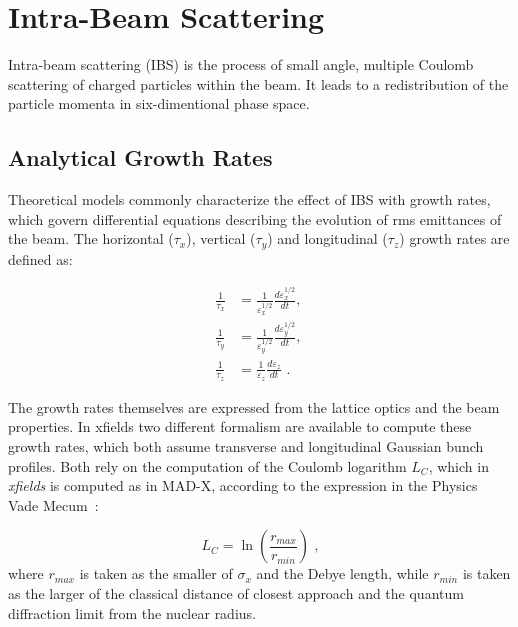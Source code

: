 \section{Intra-Beam Scattering}

Intra-beam scattering (IBS) is the process of small angle, multiple Coulomb scattering of charged particles within the beam.
It leads to a redistribution of the particle momenta in six-dimentional phase space.

\subsection{Analytical Growth Rates}

Theoretical models commonly characterize the effect of IBS with growth rates, which govern differential equations describing the evolution of rms emittances of the beam.
The horizontal (\(\tau_x\)), vertical (\(\tau_y\)) and longitudinal (\(\tau_z\)) growth rates are defined as:

\begin{equation}
    \begin{aligned}
        \frac{1}{\tau_x} &= \frac{1}{\varepsilon_x^{1/2}} \frac{d \varepsilon_x^{1/2}}{dt} \text{,  } \\
        \frac{1}{\tau_y} &= \frac{1}{\varepsilon_y^{1/2}} \frac{d \varepsilon_y^{1/2}}{dt} \text{,  } \\
        \frac{1}{\tau_z} &= \frac{1}{\varepsilon_z} \frac{d \varepsilon_z}{dt} \text{ .}
    \end{aligned}
    \label{equation:ibs_rms_emittances_evolutions}
\end{equation}

The growth rates themselves are expressed from the lattice optics and the beam properties.
In xfields two different formalism are available to compute these growth rates, which both assume transverse and longitudinal Gaussian bunch profiles.
Both rely on the computation of the Coulomb logarithm \(L_C\), which in \textit{xfields} is computed as in MAD-X, according to the expression in the Physics Vade Mecum~\cite{AIP:Anderson:Physics_Vade_Mecum}:

\begin{equation}
    L_C = \ln \left( \frac{r_{max}}{r_{min}} \right) \text{ ,}
    \label{equation:coulomb_logarithm}
\end{equation}
where \(r_{max}\) is taken as the smaller of \(\sigma_x\) and the Debye length, while \(r_{min}\) is taken as the larger of the classical distance of closest approach and the quantum diffraction limit from the nuclear radius.

